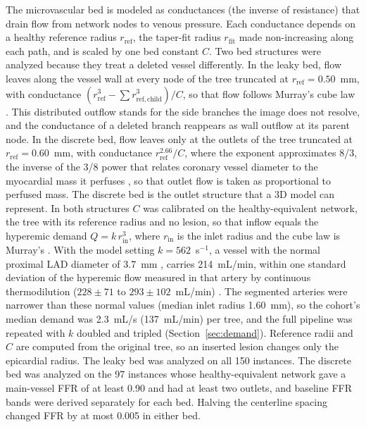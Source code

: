 \documentclass[journal]{IEEEtran}
\begin{document}
The microvascular bed is modeled as conductances (the inverse of resistance) that drain flow from network nodes to
venous pressure. Each conductance depends on a healthy reference radius $r_\mathrm{ref}$, the taper-fit radius
$r_\mathrm{fit}$ made non-increasing along each path, and is scaled by one bed constant $C$. Two bed structures were analyzed because they treat a deleted vessel differently. In the leaky
bed, flow leaves along the vessel wall at every node of the tree truncated at $r_\mathrm{ref} = 0.50$~mm, with
conductance $(r_\mathrm{ref}^3 - \sum r_{\mathrm{ref},\mathrm{child}}^3)/C$, so that flow follows Murray's cube law
\cite{murray1926}. This distributed outflow stands for the side branches the image does not resolve, and the
conductance of a deleted branch reappears as wall outflow at its parent node. In the discrete bed, flow leaves only
at the outlets of the tree truncated at $r_\mathrm{ref} = 0.60$~mm, with conductance $r_\mathrm{ref}^{2.66}/C$,
where the exponent approximates 8/3, the inverse of the 3/8 power that relates coronary vessel diameter to the
myocardial mass it perfuses \cite{choy2008}, so that outlet flow is taken as proportional to perfused mass. The discrete bed is the outlet structure that a 3D model can
represent. In both structures $C$ was calibrated on the healthy-equivalent network, the tree with its reference
radius and no lesion, so that inflow equals the hyperemic demand $Q = k\,r_\mathrm{in}^3$, where $r_\mathrm{in}$ is
the inlet radius and the cube law is Murray's \cite{murray1926}. With the model setting $k = 562$~s$^{-1}$, a
vessel with the normal proximal LAD diameter of 3.7~mm \cite{dodge1992}, carries 214~mL/min,
within one standard deviation of the hyperemic flow measured in that artery by continuous thermodilution
($228 \pm 71$ to $293 \pm 102$~mL/min) \cite{fournier2021}. The segmented arteries were narrower than these
normal values (median inlet radius 1.60~mm), so the cohort's median demand was 2.3~mL/s (137~mL/min) per tree, and
the full pipeline was repeated with $k$ doubled and tripled (Section~\ref{sec:demand}). Reference radii and $C$ are computed from the original tree, so an inserted lesion changes
only the epicardial radius. The leaky bed was analyzed on all 150 instances. The discrete bed was analyzed on the
97 instances whose healthy-equivalent network gave a main-vessel FFR of at least 0.90 and had at least two outlets,
and baseline FFR bands were derived separately for each bed. Halving the centerline spacing changed FFR by at most
0.005 in either bed.
\end{document}
